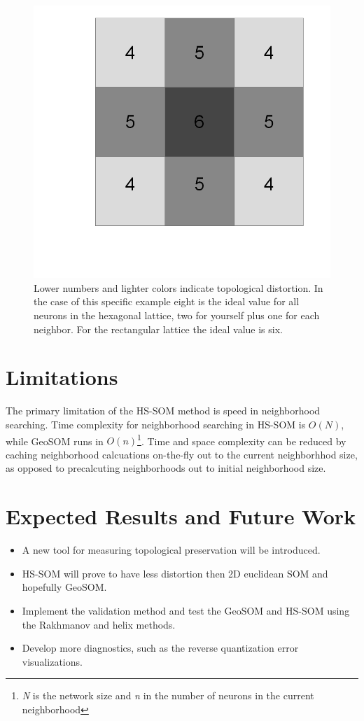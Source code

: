 \documentclass[12pt]{article}
\begin{document}
\begin{figure}
\centering
\includegraphics[width=0.4\linewidth]{figure_rect.png}
\caption{Lower numbers and lighter colors indicate topological distortion.  In
the case of this specific example eight is the ideal value for all neurons in
the hexagonal lattice, two for yourself plus one for each neighbor.  For the
rectangular lattice the ideal value is six.}
\label{figure3}
\end{figure}

\section{Limitations}
The primary limitation of the HS-SOM method is speed in neighborhood
searching. Time complexity for neighborhood searching in HS-SOM is
\begin{math}O(N)\end{math}, while GeoSOM runs in
\begin{math}O(n)\end{math}\footnote{\textit{N} is the network size and
\textit{n} in the number of neurons in the current
neighborhood}\citep{Wu:2006lr}. Time and space complexity can be reduced by
caching neighborhood calcuations on-the-fly out to the current neighborhhod
size, as opposed to precalcuting neighborhoods out to initial neighborhood
size.
\section{Expected Results and Future Work}
\begin{itemize}
\item A new tool for measuring topological preservation will be introduced.
\item HS-SOM will prove to have less distortion then 2D euclidean SOM and hopefully GeoSOM.
\item Implement the validation method and test the GeoSOM and HS-SOM using the Rakhmanov and helix methods.
\item Develop more diagnostics, such as the reverse quantization error visualizations.
\end{itemize}



\end{document}
